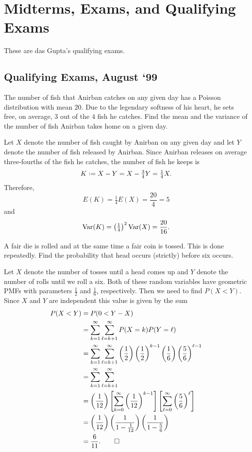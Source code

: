\section{Midterms, Exams, and Qualifying Exams}
These are das Gupta's qualifying exams.
\subsection{Qualifying Exams, August `99}
\begin{problem}
  The number of fish that Anirban catches on any given day has a Poisson
  distribution with mean \(20\). Due to the legendary softness of his
  heart, he sets free, on average, \(3\) out of the \(4\) fish he
  catches. Find the mean and the variance of the number of fish Anirban
  takes home on a given day.
\end{problem}
\begin{solution*}
  Let \(X\) denote the number of fish caught by Anirban on any given day
  and let \(Y\) denote the number of fish released by Anirban. Since
  Anirban releases on average three-fourths of the fish he catches, the
  number of fish he keeps is
  \[
    K\defeq X-Y=X-\tfrac{3}{4}Y=\tfrac{1}{4}X.
  \]
  Therefore,
  \[
    E(K)=\tfrac{1}{4}E(X)=\frac{20}{4}=5
  \]
  and
  \[
    \operatorname{Var}(K)=\left(\tfrac{1}{4}\right)^2\operatorname{Var}(X)=\frac{20}{16}.
  \]
\end{solution*}

\begin{problem}
  A fair die is rolled and at the same time a fair coin is tossed. This is
  done repeatedly. Find the probability that head occurs (strictly) before
  six occurs.
\end{problem}
\begin{solution*}
  Let \(X\) denote the number of tosses until a head comes up and \(Y\)
  denote the number of rolls until we roll a six. Both of these random
  variables have geometric PMFs with parameters \(\frac{1}{2}\) and
  \(\frac{1}{6}\), respectively. Then we need to find \(P(X<Y)\). Since
  \(X\) and \(Y\) are independent this value is given by the sum
  \begin{align*}
    P(X<Y)
    &=P(0<Y-X)\\
    &=\sum_{k=1}^\infty\sum_{\ell=k+1}^\infty P(X=k)P(Y=\ell)\\
    &=\sum_{k=1}^\infty\sum_{\ell=k+1}^\infty
      \left(\frac{1}{2}\right)\left(\frac{1}{2}\right)^{k-1}
      \left(\frac{1}{6}\right)\left(\frac{5}{6}\right)^{\ell-1}\\
    &=\sum_{k=1}^\infty\sum_{\ell=k+1}^\infty\\
    &=\left(\frac{1}{12}\right)
     \left[\sum_{k=0}^\infty
      \left(\frac{1}{12}\right)^{k-1}
      \right]
      \left[\sum_{\ell=0}^\infty \left(\frac{5}{6}\right)^\ell\right]\\
    &=\left(\frac{1}{12}\right)
      \left(\frac{1}{1-\frac{1}{12}}\right)
      \left(\frac{1}{1-\frac{5}{6}}\right)\\
    &=\frac{6}{11}.\qedhere
  \end{align*}
\end{solution*}

